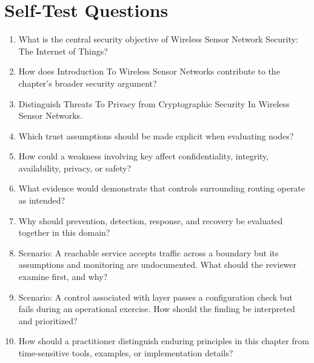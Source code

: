 \documentclass[11pt]{article}
\begin{document}
\section*{Self-Test Questions}
\begin{enumerate}
\item What is the central security objective of Wireless Sensor Network Security: The Internet of Things?
\item How does Introduction To Wireless Sensor Networks contribute to the chapter's broader security argument?
\item Distinguish Threats To Privacy from Cryptographic Security In Wireless Sensor Networks.
\item Which trust assumptions should be made explicit when evaluating nodes?
\item How could a weakness involving key affect confidentiality, integrity, availability, privacy, or safety?
\item What evidence would demonstrate that controls surrounding routing operate as intended?
\item Why should prevention, detection, response, and recovery be evaluated together in this domain?
\item Scenario: A reachable service accepts traffic across a boundary but its assumptions and monitoring are undocumented. What should the reviewer examine first, and why?
\item Scenario: A control associated with layer passes a configuration check but fails during an operational exercise. How should the finding be interpreted and prioritized?
\item How should a practitioner distinguish enduring principles in this chapter from time-sensitive tools, examples, or implementation details?
\end{enumerate}
\end{document}
